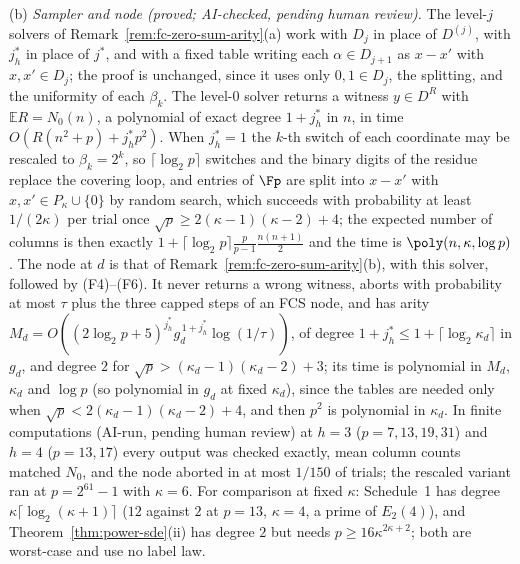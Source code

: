 \begin{remark}
\textup{(b)} \emph{Sampler and node (proved; AI-checked, pending human review).} The level-$j$ solvers of Remark~\ref{rem:fc-zero-sum-arity}(a) work with $D_j$ in place of $D^{(j)}$, with $j^*_h$ in place of $j^*$, and with a fixed table writing each $\alpha \in D_{j+1}$ as $x - x'$ with $x,x' \in D_j$; the proof is unchanged, since it uses only $0,1 \in D_j$, the splitting, and the uniformity of each $\beta_k$. The level-$0$ solver returns a witness $y \in D^R$ with $\mathbb{E}R = N_0(n)$, a polynomial of exact degree $1 + j^*_h$ in $n$, in time $O(R(n^2+p) + j^*_hp^2)$. When $j^*_h = 1$ the $k$-th switch of each coordinate may be rescaled to $\beta_k = 2^k$, so $\lceil\log_2 p\rceil$ switches and the binary digits of the residue replace the covering loop, and entries of $\Fp$ are split into $x - x'$ with $x, x' \in P_\kappa\cup\{0\}$ by random search, which succeeds with probability at least $1/(2\kappa)$ per trial once $\sqrt p \ge 2(\kappa-1)(\kappa-2)+4$; the expected number of columns is then exactly $1 + \lceil\log_2p\rceil\frac{p}{p-1}\frac{n(n+1)}{2}$ and the time is $\poly(n,\kappa,\log p)$. The node at $d$ is that of Remark~\ref{rem:fc-zero-sum-arity}(b), with this solver, followed by (F4)--(F6). It never returns a wrong witness, aborts with probability at most $\tau$ plus the three capped steps of an FCS node, and has arity $M_d = O((2\log_2p+5)^{j^*_h}g_d^{\,1+j^*_h}\log(1/\tau))$, of degree $1 + j^*_h \le 1 + \lceil\log_2\kappa_d\rceil$ in $g_d$, and degree $2$ for $\sqrt p > (\kappa_d-1)(\kappa_d-2)+3$; its time is polynomial in $M_d$, $\kappa_d$ and $\log p$ (so polynomial in $g_d$ at fixed $\kappa_d$), since the tables are needed only when $\sqrt p < 2(\kappa_d-1)(\kappa_d-2)+4$, and then $p^2$ is polynomial in $\kappa_d$. In finite computations (AI-run, pending human review) at $h = 3$ ($p = 7,13,19,31$) and $h = 4$ ($p = 13,17$) every output was checked exactly, mean column counts matched $N_0$, and the node aborted in at most $1/150$ of trials; the rescaled variant ran at $p = 2^{61}-1$ with $\kappa = 6$. For comparison at fixed $\kappa$: Schedule~1 has degree $\kappa\lceil\log_2(\kappa+1)\rceil$ ($12$ against $2$ at $p = 13$, $\kappa = 4$, a prime of $E_2(4)$), and Theorem~\ref{thm:power-sde}(ii) has degree $2$ but needs $p \ge 16\kappa^{2\kappa+2}$; both are worst-case and use no label law.


\end{remark}
